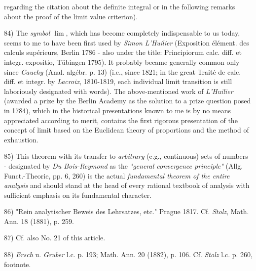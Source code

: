 \vfill
\leftline{\rule{2in}{0.4pt}}
\vspace{0.1cm}
{
\footnotesize
regarding the citation about the definite integral or in the following remarks about the proof of the limit value criterion).

84) The \textit{symbol $\lim$}, which has become completely indispensable to us today, seems to me to have been first used by \textit{Simon L'Huilier} (Exposition élément. des calculs supérieurs, Berlin 1786 - also under the title: Principiorum calc. diff. et integr. expositio, Tübingen 1795). It probably became generally common only since \textit{Cauchy} (Anal. algébr. p. 13) (i.e., since 1821; in the great Traité de calc. diff. et integr. by \textit{Lacroix}, 1810-1819, each individual limit transition is still laboriously designated with words). The above-mentioned work of \textit{L'Huilier} (awarded a prize by the Berlin Academy as the solution to a prize question posed in 1784), which in the historical presentations known to me is by no means appreciated according to merit, contains the first rigorous presentation of the concept of limit based on the Euclidean theory of proportions and the method of exhaustion.

85) This theorem with its transfer to \textit{arbitrary} (e.g., continuous) sets of numbers - designated by \textit{Du Bois-Reymond} as the \textit{"general convergence principle"} (Allg. Funct.-Theorie, pp. 6, 260) is the actual \textit{fundamental theorem of the entire analysis} and should stand at the head of every rational textbook of analysis with sufficient emphasis on its fundamental character.

86) "Rein analytischer Beweis des Lehrsatzes, etc." Prague 1817. Cf. \textit{Stolz}, Math. Ann. 18 (1881), p. 259.

87) Cf. also No. 21 of this article.

88) \textit{Ersch} u. \textit{Gruber} l.c. p. 193; Math. Ann. 20 (1882), p. 106. Cf. \textit{Stolz} l.c. p. 260, footnote.

}